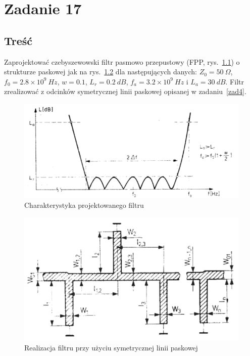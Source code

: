 \documentclass[rep.tex]{subfiles}
\begin{document}
\chapter{Zadanie 17}
\label{zad17}
\section{Treść}
Zaprojektować czebyszewowski filtr pasmowo przepustowy (FPP, rys.~\ref{fig:zad17:cheb}) o strukturze
paskowej jak na rys.~\ref{fig:zad17:strip} dla następujących danych: $Z_0 = 50~\Omega$, $f_0 = 2.8 \times 10^9~Hz$, $w = 0.1$,
$L_r = 0.2~dB$, $f_a = 3.2 \times 10^9~Hz$ i $L_a = 30~dB$.
Filtr zrealizować z odcinków symetrycznej linii paskowej opisanej w zadaniu~\ref{zad4}.

\begin{figure}[!htbp]
  \centering
  \includegraphics[scale=0.5]{fig/zad17/cheb}
  \caption{Charakterystyka projektowanego filtru}
  \label{fig:zad17:cheb}
\end{figure}

\begin{figure}[!htbp]
  \centering
  \includegraphics[scale=0.5]{fig/zad17/strip}
  \caption{Realizacja filtru przy użyciu symetrycznej linii paskowej}
  \label{fig:zad17:strip}
\end{figure}
\end{document}
